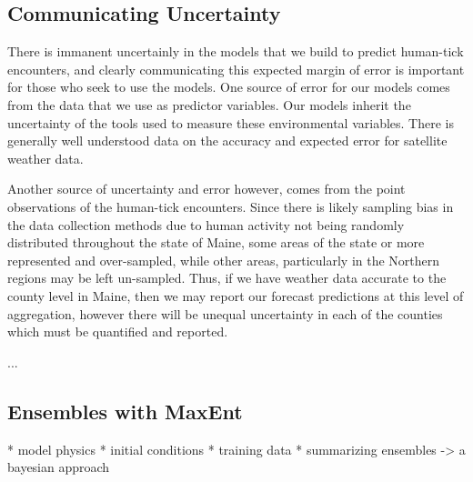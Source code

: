 \subsection{Communicating Uncertainty}
There is immanent uncertainly in the models that we build to predict human-tick encounters, and clearly communicating this expected margin of error is important for those who seek to use the models. One source of error for our models comes from the data that we use as predictor variables. Our models inherit the uncertainty of the tools used to measure these environmental variables. There is generally well understood data on the accuracy and expected error for satellite weather data. \newline

\noindent Another source of uncertainty and error however, comes from the point observations of the human-tick encounters. Since there is likely sampling bias in the data collection methods due to human activity not being randomly distributed throughout the state of Maine, some areas of the state or more represented and over-sampled, while other areas, particularly in the Northern regions may be left un-sampled. Thus, if we have weather data accurate to the county level in Maine, then we may report our forecast predictions at this level of aggregation, however there will be unequal uncertainty in each of the counties which must be quantified and reported.

 ...\newline

\subsection{Ensembles with MaxEnt}
* model physics \newline
* initial conditions\newline
* training data \newline
* summarizing ensembles -> a bayesian approach \newline


